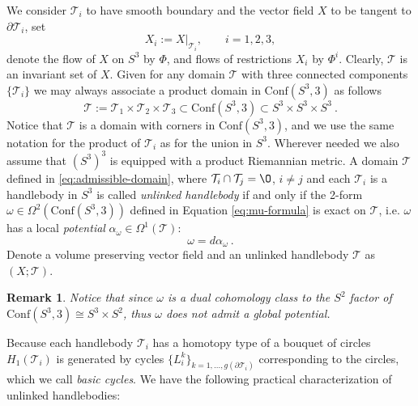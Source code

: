 \documentclass[12pt]{article}
\newtheorem{rem}[theorem]{Remark}
\newenvironment{remark}{\begin{rem} \rm}{\end{rem}}
\newcommand{\Cnf}{\text{Conf}}
\newcommand{\no}{\noindent}
\begin{document}
 We consider $\mathcal{T}_i$ to have smooth boundary and the vector field $X$ to be tangent to  $\partial \mathcal{T}_i$, set
\[
 X_i:=X\bigl|_{\mathcal{T}_i},\qquad i=1,2,3,
\]
 denote the flow of $X$ on $S^3$ by $\Phi$, and flows of restrictions $X_i$ by $\Phi^i$.  Clearly,
 $\mathcal{T}$ is an invariant set of $X$.
 Given for any domain $\mathcal{T}$ with three connected components $\{\mathcal{T}_i\}$ we may always associate a product domain in $\Cnf(S^3,3)$ as follows
\begin{equation}\label{eq:admissible-domain}
 \mathcal{T}:=\mathcal{T}_1\times \mathcal{T}_2\times \mathcal{T}_3\subset \text{Conf}(S^3,3)\subset S^3\times S^3\times S^3\ .
\end{equation}
Notice that $\mathcal{T}$ is a domain with corners in $\Cnf(S^3,3)$, and we use the same notation for the product of $\mathcal{T}_i$ as for the union in $S^3$. Wherever needed we also assume that 
$(S^3)^3$ is equipped with a product Riemannian metric.
 A domain $\mathcal{T}$ defined in \eqref{eq:admissible-domain}, where $\mathcal{T}_i\cap \mathcal{T}_j=\O$, $i\neq j$ and each $\mathcal{T}_i$ is a handlebody in $S^3$ is called \emph{unlinked handlebody} if and only if the 2-form $\omega\in\Omega^2(\Cnf(S^3,3))$ defined in Equation \eqref{eq:mu-formula} is exact on $\mathcal{T}$, i.e. $\omega$ has a local \emph{potential} $\alpha_\omega\in \Omega^1(\mathcal{T})$: 
\begin{equation}\label{eq:omega-exact}
 \omega=d\alpha_\omega\ .
\end{equation}
Denote a volume preserving vector field and an unlinked handlebody $\mathcal{T}$ as $(X;\mathcal{T})$.


\begin{remark}
\no Notice that since $\omega$ is a dual cohomology class to the $S^2$ factor of $\Cnf(S^3,3)\cong S^3\times S^2$, thus $\omega$ does not admit a global potential.
\end{remark}
\no Because each handlebody $\mathcal{T}_i$ has a homotopy type of a bouquet of circles $H_1(\mathcal{T}_i)$ is generated by cycles $\{L^k_i\}_{k=1,\ldots,g(\partial\mathcal{T}_i)}$ corresponding to the circles, which we call \emph{basic cycles}. We have the following practical characterization of unlinked handlebodies:
\end{document}
